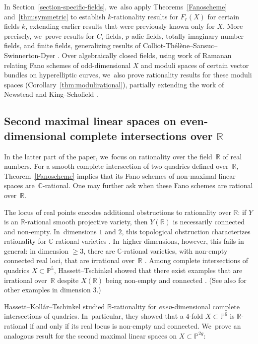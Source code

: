 \documentclass[JEP,XML,SOM,Unicode,NoEqCountersInSection,published]{cedram}
\let\bb\mathbb\let\Bbb\mathbb
\theoremstyle{plain}
\theoremstyle{definition}
\newcommand\R{\mathbb{R}}
\begin{document}
In Section~\ref{section-specific-fields}, we~also apply Theorems~\ref{Fanoscheme} and~\ref{thm:symmetric} to establish \(k\)-rationality results for \(F_r(X)\) for certain fields \(k\), extending earlier results that were previously known only for $X$.
More precisely, we~prove results for $C_i$-fields, $p$-adic fields, totally imaginary number fields, and finite fields, generalizing results of Colliot-Thélène--Sansuc--Swinnerton-Dyer \cite[Th.\,3.4]{CTSSD}.
Over algebraically closed fields, using work of Ramanan \cite{Ramanan81} relating Fano schemes of odd-dimensional \(X\) and moduli spaces of certain vector bundles on hyperelliptic curves, we~also prove rationality results for these moduli spaces (Corollary~\ref{thm:modulirational}), partially extending the work of Newstead \cite{Newstead75, Newstead80} and King--Schofield \cite{KingSchofield}.

\subsection{Second maximal linear spaces on even-dimensional complete intersections over $\R$}\label{intro-main3}
In the latter part of the paper, we~focus on rationality over the field~\(\bb R\) of real numbers. For a smooth complete intersection of two quadrics defined over~\(\bb R\), Theorem~\ref{Fanoscheme} implies that its Fano schemes of non-maximal linear spaces are~$\bb C$-rational. One may further ask when these Fano schemes are rational over~\(\bb R\).

The locus of real points encodes additional obstructions to rationality over \(\bb R\): if \(Y\) is an \(\bb R\)-rational smooth projective variety, then \(Y(\bb R)\) is necessarily connected and non-empty. In~dimensions \(1\) and \(2\), this topological obstruction characterizes rationality for \(\bb C\)-rational varieties \cite{Comessatti1913}. In~higher dimensions, however, this fails in general: in dimension \(\geq 3\), there are \(\bb C\)-rational varieties, with non-empty connected real loci, that are irrational over~\(\bb R\) \cite[Th.\,5.7]{BW20}.
Among complete intersections of quadrics \(X \subset \bb P^5\), Hassett--Tschinkel showed that there exist examples that are irrational over~\(\bb R\) despite \(X(\bb R)\) being non-empty and connected \cite{HT-intersection-quadrics}. (See also \cite{FJSVV, JJ} for other examples in dimension \(3\).)

Hassett--Kollár--Tschinkel studied \(\bb R\)-rationality for \emph{even}-dimensional complete intersections of quadrics. In~particular, they showed that a \(4\)-fold \(X \subset \bb P^6\) is \(\bb R\)\nobreakdash-rational if and only if its real locus is non-empty and connected. We~prove an analogous result for the second maximal linear spaces on \(X \subset \bb P^{2g}\):
\end{document}
